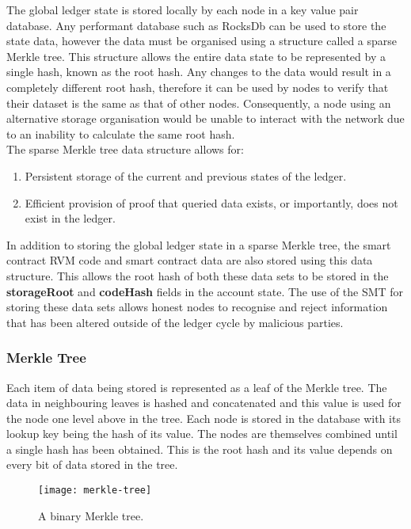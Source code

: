 
The global ledger state is stored locally by each node in a key value pair database. Any performant database such as RocksDb can be used to store the state data, however the data must be organised using a structure called a sparse Merkle tree. This structure allows the entire data state to be represented by a single hash, known as the root hash. Any changes to the data would result in a completely different root hash, therefore it can be used by nodes to verify that their dataset is the same as that of other nodes. Consequently, a node using an alternative storage organisation would be unable to interact with the network due to an inability to calculate the same root hash.\\

The sparse Merkle tree data structure allows for:

\begin{enumerate}
\item Persistent storage of the current and previous states of the ledger.
\item Efficient provision of proof that queried data exists, or importantly, does not exist in the ledger.\end{enumerate}

In addition to storing the global ledger state in a sparse Merkle tree, the smart contract RVM code and smart contract data are also stored using this data structure. This allows the root hash of both these data sets to be stored in the \textbf{storageRoot} and \textbf{codeHash} fields in the account state.  The use of the SMT for storing these data sets allows honest nodes to recognise and reject information that has been altered outside of the ledger cycle by malicious parties. \\

\subsubsection{Merkle Tree}

Each item of data being stored is represented as a leaf of the Merkle tree. The data in neighbouring leaves is hashed and concatenated and this value is used for the node one level above in the tree. Each node is stored in the database with its lookup key being the hash of its value. The nodes are themselves combined until a single hash has been obtained. This is the root hash and its value depends on every bit of data stored in the tree.\\

\begin{figure}[h]
  \centering
  \captionsetup{format=hang, font=footnotesize}
  \caption{A binary Merkle tree.}
\texttt{[image: merkle-tree]}
\end{figure}

